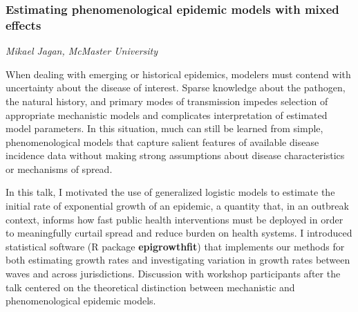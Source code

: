 % 

\subsubsection*{Estimating phenomenological epidemic models with mixed effects}

\textit{Mikael Jagan, McMaster University}

When dealing with emerging or historical epidemics, modelers must
contend with uncertainty about the disease of interest.  Sparse
knowledge about the pathogen, the natural history, and primary modes
of transmission impedes selection of appropriate mechanistic models
and complicates interpretation of estimated model parameters.  In
this situation, much can still be learned from simple, phenomenological
models that capture salient features of available disease incidence
data without making strong assumptions about disease characteristics
or mechanisms of spread.

In this talk, I motivated the use of generalized logistic models
to estimate the initial rate of exponential growth of an epidemic,
a quantity that, in an outbreak context, informs how fast public health
interventions must be deployed in order to meaningfully curtail spread
and reduce burden on health systems.  I introduced statistical software
(\textsf{R} package \textbf{epigrowthfit}) that implements our methods
for both estimating growth rates and investigating variation in growth
rates between waves and across jurisdictions.  Discussion with workshop
participants after the talk centered on the theoretical distinction
between mechanistic and phenomenological epidemic models.

% 
